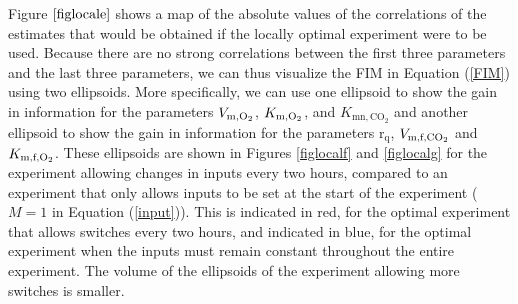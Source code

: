 Figure $\ref{figlocale}$ shows a map of the absolute values of the correlations of the estimates that would be obtained if the locally optimal experiment were to be used. Because there are no strong correlations between the first three parameters and the last three parameters, we can thus visualize the FIM in Equation (\ref{FIM}) using two ellipsoids. More specifically, we can use one ellipsoid to show the gain in information for the parameters $V_{\text{m},\text{O}_2}$, $K_{\text{m},\text{O}_2}$, and $K_{\text{mn},\text{CO}_2}$ and another ellipsoid to show the gain in information for the parameters $\text{r}_\text{q}$, $V_{\text{m,f,}\text{CO}_2}$ and $K_{\text{m,f,}\text{O}_2}$. These ellipsoids are shown in Figures \ref{figlocalf} and \ref{figlocalg} for the experiment allowing changes in inputs every two hours, compared to an experiment that only allows inputs to be set at the start of the experiment ($M=1$ in Equation (\ref{input})). This is indicated in red, for the optimal experiment that allows switches every two hours, and indicated in blue, for the optimal experiment when the inputs must remain constant throughout the entire experiment. The volume of the ellipsoids of the experiment allowing more switches is smaller.
